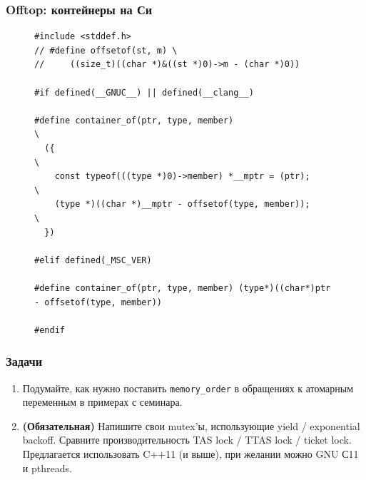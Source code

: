 \documentclass[aspectratio=169, pdf, 8pt, unicode]{beamer}
\begin{document}
\begin{frame}[fragile]
\frametitle{Offtop: контейнеры на Си}
\begin{figure}[H]
\centering
\begin{minipage}{0.8\textwidth}
\begin{verbatim}
#include <stddef.h>
// #define offsetof(st, m) \
//     ((size_t)((char *)&((st *)0)->m - (char *)0))

#if defined(__GNUC__) || defined(__clang__)

#define container_of(ptr, type, member)                                        \
  ({                                                                           \
    const typeof(((type *)0)->member) *__mptr = (ptr);                         \
    (type *)((char *)__mptr - offsetof(type, member));                         \
  })

#elif defined(_MSC_VER)

#define container_of(ptr, type, member) (type*)((char*)ptr - offsetof(type, member))

#endif    
\end{verbatim}
\end{minipage}
\end{figure}
\end{frame}

\begin{frame}
\frametitle{Задачи}
\begin{enumerate}
\item Подумайте, как нужно поставить \texttt{memory\_order} в обращениях к атомарным переменным в примерах с семинара.
\item \textbf{(Обязательная)} Напишите свои mutex'ы, использующие yield / exponential backoff.
    Сравните производительность TAS lock / TTAS lock / ticket lock.
    Предлагается использовать C++11 (и выше), при желании можно GNU С11 и pthreads.
\end{enumerate}

\end{frame}
\end{document}
